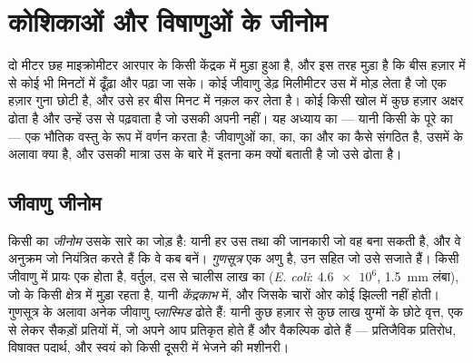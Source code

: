 \chapter{कोशिकाओं और विषाणुओं के जीनोम}\label{ch:b1:genomes}

दो मीटर  छह माइक्रोमीटर आरपार के किसी केंद्रक में मुड़ा हुआ है, और इस
तरह मुड़ा है कि बीस हज़ार  में से कोई भी मिनटों में ढूँढ़ा और पढ़ा
जा सके। कोई जीवाणु डेढ़ मिलीमीटर उस  में मोड़ लेता है जो एक हज़ार
गुना छोटी है, और उसे हर बीस मिनट में नक़ल कर लेता है। कोई  किसी
 खोल में कुछ हज़ार अक्षर ढोता है और उन्हें उस  से पढ़वाता है
जो उसकी अपनी नहीं। यह अध्याय \emph{} का ---
यानी किसी  के पूरे  का --- एक भौतिक वस्तु के रूप में वर्णन करता है:
जीवाणुओं का,   का,  का और  का 
कैसे संगठित है, उसमें  के अलावा क्या है, और उसकी मात्रा उस  के
बारे में इतना कम क्यों बताती है जो उसे ढोता है।

\section{जीवाणु जीनोम}

\begin{definition}[जीनोम, गुणसूत्र, केंद्रकाभ]\label{def:b1:genomes:genome}
किसी  का \emph{जीनोम} उसके सारे  का जोड़ है:
यानी हर उस  तथा  की जानकारी जो वह बना सकती है, और वे
अनुक्रम जो नियंत्रित करते हैं कि वे कब बनें। \emph{गुणसूत्र}
एक  अणु है, उन  सहित जो उसे सजाते हैं। किसी जीवाणु में
प्रायः एक होता है, वर्तुल, दस से चालीस लाख  का
(\emph{E. coli}: $\num{4.6e6}$, \qty{1.5}{mm} लंबा), जो  के
किसी क्षेत्र में मुड़ा रहता है, यानी \emph{केंद्रकाभ}
में, और जिसके चारों ओर कोई झिल्ली नहीं होती। गुणसूत्र के अलावा अनेक
जीवाणु \emph{प्लास्मिड} ढोते हैं: यानी कुछ हज़ार से कुछ
लाख युग्मों के छोटे वृत्त, एक से लेकर सैकड़ों प्रतियों में, जो अपने आप
प्रतिकृत होते हैं और वैकल्पिक  ढोते हैं --- प्रतिजैविक प्रतिरोध,
विषाक्त पदार्थ, और स्वयं को किसी दूसरी  में भेजने की मशीनरी।
\end{definition}

